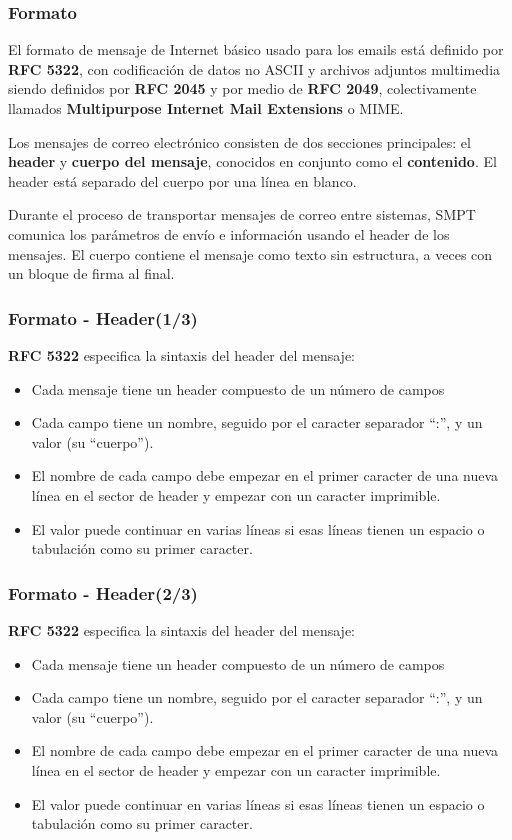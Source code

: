 \documentclass{beamer}
\begin{document}
\begin{frame}
\frametitle{Formato}
\tableofcontents
\small El formato de mensaje de Internet básico usado para los emails está definido por \textbf{RFC 5322}, con codificación de datos no ASCII y archivos adjuntos multimedia siendo definidos por \textbf{RFC 2045} y por medio de\textbf{ RFC 2049}, colectivamente llamados \textbf{Multipurpose Internet Mail Extensions} o MIME.

\small Los mensajes de correo electrónico consisten de dos secciones principales: el \textbf{ header} y \textbf{cuerpo del mensaje}, conocidos en conjunto como el \textbf{contenido}. El header está separado del cuerpo por una línea en blanco.

\small Durante el proceso de transportar mensajes de correo entre sistemas, SMPT comunica los parámetros de envío e información usando el header de los mensajes. El cuerpo contiene el mensaje como texto sin estructura, a veces con un bloque de firma al final. 

\end{frame}

\begin{frame}
\frametitle{Formato - Header(1/3)}
\tableofcontents
\textbf{RFC 5322} especifica la sintaxis del header del mensaje: 
\begin{itemize}
\item \small Cada mensaje tiene un header compuesto de un número de campos
\item \small Cada campo tiene un nombre, seguido por el caracter separador “:”, y un valor (su “cuerpo”).
\item \small El nombre de cada campo debe empezar en el primer caracter de una nueva línea en el sector de header y empezar con un caracter imprimible. 
\item \small El valor puede continuar en varias líneas si esas líneas tienen un espacio o tabulación como su primer caracter. 
\end{itemize}

\end{frame}

\begin{frame}
\frametitle{Formato - Header(2/3)}
\tableofcontents
\textbf{RFC 5322} especifica la sintaxis del header del mensaje: 
\begin{itemize}
\item \small Cada mensaje tiene un header compuesto de un número de campos
\item \small Cada campo tiene un nombre, seguido por el caracter separador “:”, y un valor (su “cuerpo”).
\item \small El nombre de cada campo debe empezar en el primer caracter de una nueva línea en el sector de header y empezar con un caracter imprimible. 
\item \small El valor puede continuar en varias líneas si esas líneas tienen un espacio o tabulación como su primer caracter. 
\end{itemize}

\end{frame}
\end{document}
